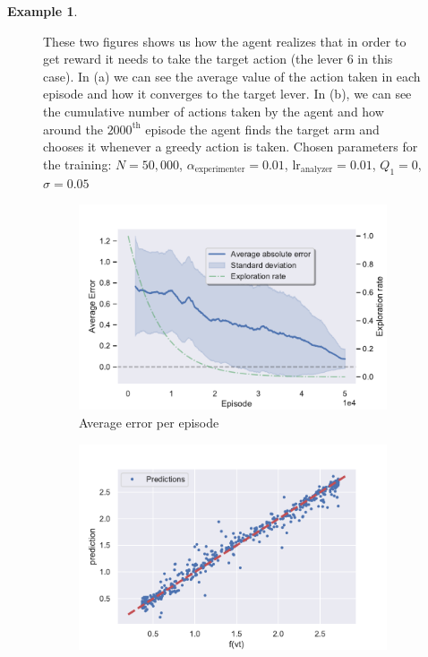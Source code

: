 \documentclass[11pt,a4paper,twoside]{report}
\newcommand{\+}{\textnormal{+} }
\theoremstyle{definition}
\newtheorem{myex}[mythm]{Example}
\numberwithin{equation}{chapter}
\begin{document}
\begin{myex}
\begin{figure}[]
{      These two figures shows us how the agent realizes that in order to get
      reward it needs to take the target action (the lever 6 in this case). In
      (a) we can see the average value of the action taken in each episode and
      how it converges to the target lever. In (b), we can see the cumulative
      number of actions taken by the agent and how around the $2000^\text{th}$
      episode the agent finds the target arm and chooses it whenever a greedy
      action is taken. Chosen parameters for the training: $N=50,000$,
      $\alpha_\text{experimenter}=0.01$, $\text{lr}_\text{analyzer}=0.01$,
      $Q_1=0$, $\sigma=0.05$}
    \end{figure}

  

    \begin{figure}[]
      \centering
      \begin{subfigure}{.5\textwidth}
        \centering
        \includegraphics[width=1\linewidth]{figures/Error-MAB2.pdf}
        \caption{Average error per episode}
        \label{fig:ErrorAverageMAB2}
      \end{subfigure}%
      \begin{subfigure}{.5\textwidth}
        \centering
        \includegraphics[width=1\linewidth]{figures/predictions-MAB2.pdf}

\end{subfigure}
\end{figure}
\end{myex}
\end{document}
